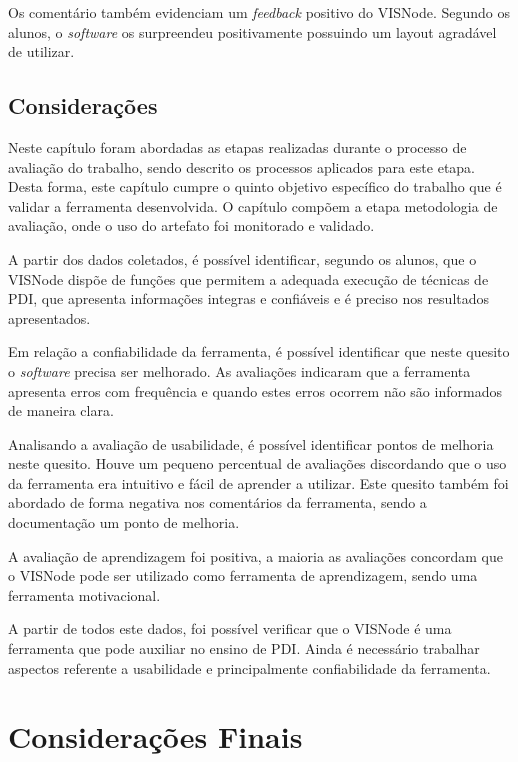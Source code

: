 \documentclass[
	12pt,				%
	oneside,			%
	a4paper,			%
	english,			%
	french,				%
	spanish,			%
	brazil,				%
	]{abntex2}
\begin{document}
Os comentário também evidenciam um \textit{feedback} positivo do VISNode. Segundo os alunos, o \textit{software} os surpreendeu positivamente possuindo um layout agradável de utilizar.


\section{Considerações}

Neste capítulo foram abordadas as etapas realizadas durante o processo de avaliação do trabalho, sendo descrito os processos aplicados para este etapa. Desta forma, este capítulo cumpre o quinto objetivo específico do trabalho que é validar a ferramenta desenvolvida. O capítulo compõem a etapa metodologia de avaliação, onde o uso do artefato foi monitorado e validado.

A partir dos dados coletados, é possível identificar, segundo os alunos, que o VISNode dispõe de funções que permitem a adequada execução de técnicas de PDI,
que apresenta informações integras e confiáveis e é preciso nos resultados apresentados.

Em relação a confiabilidade da ferramenta, é possível identificar que neste quesito o \textit{software} precisa ser melhorado. As avaliações indicaram que a ferramenta apresenta erros com frequência e quando estes erros ocorrem não são informados de maneira clara.

Analisando a avaliação de usabilidade, é possível identificar pontos de melhoria neste quesito. Houve um pequeno percentual de avaliações discordando que o uso da ferramenta era intuitivo e fácil de aprender a utilizar. Este quesito também foi abordado de forma negativa nos comentários da ferramenta, sendo a documentação um ponto de melhoria.

A avaliação de aprendizagem foi positiva, a maioria as avaliações concordam que o VISNode pode ser utilizado como ferramenta de aprendizagem, sendo uma ferramenta motivacional.

A partir de todos este dados, foi possível verificar que o VISNode é uma ferramenta que pode auxiliar no ensino de PDI. Ainda é necessário trabalhar aspectos referente a usabilidade e principalmente confiabilidade da ferramenta.

% 

\chapter[Considerações Finais]{Considerações Finais}
\end{document}
